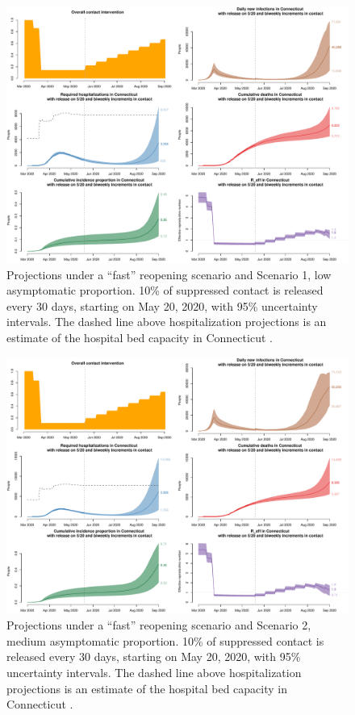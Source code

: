 \documentclass[11pt]{article}
\begin{document}
\begin{figure}[htb]
	\centering
	\includegraphics[width=.9\textwidth]{figures/fast_low_full.pdf}
	\caption{Projections under a ``fast'' reopening scenario and Scenario 1, low asymptomatic proportion. 10\% of suppressed contact is released every 30 days, starting on May 20, 2020, with 95\% uncertainty intervals. The dashed line above hospitalization projections is an estimate of the hospital bed capacity in Connecticut \citep{CHAwebsite}. }
	\label{fig:fast_low}
\end{figure}

\begin{figure}[htb]
	\centering
	\includegraphics[width=.9\textwidth]{figures/fast_medium_full.pdf}
	\caption{Projections under a ``fast'' reopening scenario and Scenario 2, medium asymptomatic proportion. 10\% of suppressed contact is released every 30 days, starting on May 20, 2020, with 95\% uncertainty intervals. The dashed line above hospitalization projections is an estimate of the hospital bed capacity in Connecticut \citep{CHAwebsite}. }
	\label{fig:fast_medium}
\end{figure}
\end{document}
